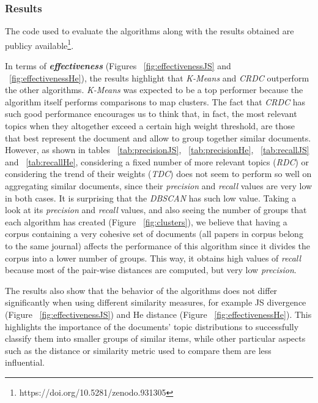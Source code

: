 \subsubsection{Results}
\label{sec:clustering-results}

The code used to evaluate the algorithms along with the results obtained are publicy available\footnote{https://doi.org/10.5281/zenodo.931305}.

In terms of \textbf{\textit{effectiveness}} (Figures ~\ref{fig:effectivenessJS} and ~\ref{fig:effectivenessHe}), the results highlight that \textit{K-Means} and \textit{CRDC} outperform the other algorithms. \textit{K-Means} was expected to be a top performer because the algorithm itself performs comparisons to map clusters. The fact that \textit{CRDC} has such good performance encourages us to think that, in fact, the most relevant topics when they altogether exceed a certain high weight threshold, are those that best represent the document and allow to group together similar documents. However, as shown in tables ~\ref{tab:precisionJS}, ~\ref{tab:precisionHe}, ~\ref{tab:recallJS} and ~\ref{tab:recallHe}, considering a fixed number of more relevant topics (\textit{RDC}) or considering the trend of their weights (\textit{TDC}) does not seem to perform so well on aggregating similar documents, since their \textit{precision} and \textit{recall} values are very low in both cases. It is surprising that the \textit{DBSCAN} has such low value. Taking a look at its \textit{precision} and \textit{recall} values, and also seeing the number of groups that each algorithm has created (Figure ~\ref{fig:clusters}), we believe that having a corpus containing a very cohesive set of documents (all papers in corpus belong to the same journal) affects the performance of this algorithm since it divides the corpus into a lower number of groups. This way, it obtains high values of \textit{recall} because most of the pair-wise distances are computed, but very low \textit{precision}.

The results also show that the behavior of the algorithms does not differ significantly when using different similarity measures, for example JS divergence (Figure ~\ref{fig:effectivenessJS}) and He distance (Figure ~\ref{fig:effectivenessHe}). This highlights the importance of the documents' topic distributions to successfully classify them into smaller groups of similar items, while other particular aspects such as the distance or similarity metric used to compare them are less influential.

